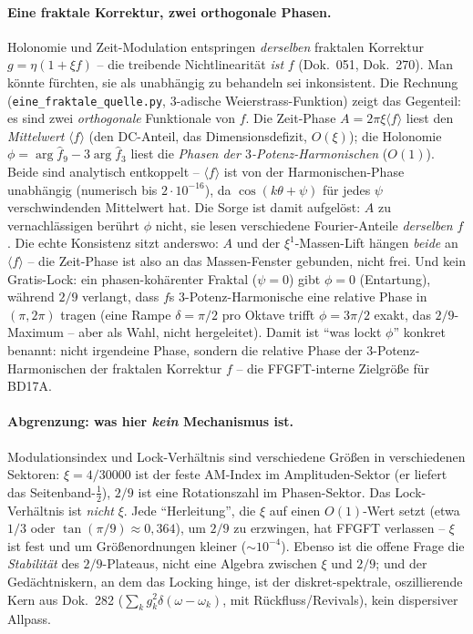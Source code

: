 \paragraph{Eine fraktale Korrektur, zwei orthogonale Phasen.} Holonomie und Zeit-Modulation
entspringen \emph{derselben} fraktalen Korrektur $g=\eta(1+\xi f)$ -- die treibende Nichtlinearität
\emph{ist} $f$ (Dok.~051, Dok.~270). Man könnte fürchten, sie als unabhängig zu behandeln sei
inkonsistent. Die Rechnung (\texttt{eine\_fraktale\_quelle.py}, $3$-adische Weierstrass-Funktion) zeigt
das Gegenteil: es sind zwei \emph{orthogonale} Funktionale von $f$. Die Zeit-Phase
$A=2\pi\xi\langle f\rangle$ liest den \emph{Mittelwert} $\langle f\rangle$ (den DC-Anteil, das
Dimensionsdefizit, $O(\xi)$); die Holonomie $\phi=\arg\hat f_9-3\arg\hat f_3$ liest die \emph{Phasen der
$3$-Potenz-Harmonischen} ($O(1)$). Beide sind analytisch entkoppelt -- $\langle f\rangle$ ist von der
Harmonischen-Phase unabhängig (numerisch bis $2\cdot10^{-16}$), da $\cos(k\theta+\psi)$ für jedes $\psi$
verschwindenden Mittelwert hat. Die Sorge ist damit aufgelöst: $A$ zu vernachlässigen berührt $\phi$
nicht, sie lesen verschiedene Fourier-Anteile \emph{derselben} $f$. Die echte Konsistenz sitzt anderswo:
$A$ und der $\xi^1$-Massen-Lift hängen \emph{beide} an $\langle f\rangle$ -- die Zeit-Phase ist also an
das Massen-Fenster gebunden, nicht frei. Und kein Gratis-Lock: ein phasen-kohärenter Fraktal ($\psi=0$)
gibt $\phi=0$ (Entartung), während $2/9$ verlangt, dass $f$s $3$-Potenz-Harmonische eine relative Phase
in $(\pi,2\pi)$ tragen (eine Rampe $\delta=\pi/2$ pro Oktave trifft $\phi=3\pi/2$ exakt, das
$2/9$-Maximum -- aber als Wahl, nicht hergeleitet). Damit ist \enquote{was lockt $\phi$} konkret
benannt: nicht irgendeine Phase, sondern die relative Phase der $3$-Potenz-Harmonischen der fraktalen
Korrektur $f$ -- die FFGFT-interne Zielgröße für BD17A.

\paragraph{Abgrenzung: was hier \emph{kein} Mechanismus ist.} Modulationsindex und Lock-Verhältnis
sind verschiedene Größen in verschiedenen Sektoren: $\xi=4/30000$ ist der feste AM-Index im
Amplituden-Sektor (er liefert das Seitenband-$\tfrac12$), $2/9$ ist eine Rotationszahl im
Phasen-Sektor. Das Lock-Verhältnis ist \emph{nicht} $\xi$. Jede \enquote{Herleitung}, die $\xi$ auf
einen $O(1)$-Wert setzt (etwa $1/3$ oder $\tan(\pi/9)\approx0{,}364$), um $2/9$ zu erzwingen, hat FFGFT
verlassen -- $\xi$ ist fest und um Größenordnungen kleiner ($\sim\!10^{-4}$). Ebenso ist die offene
Frage die \emph{Stabilität} des $2/9$-Plateaus, nicht eine Algebra zwischen $\xi$ und $2/9$; und der
Gedächtniskern, an dem das Locking hinge, ist der diskret-spektrale, oszillierende Kern aus Dok.~282
($\sum_k g_k^2\delta(\omega-\omega_k)$, mit Rückfluss/Revivals), kein dispersiver Allpass.

